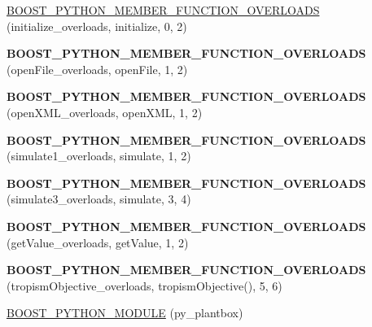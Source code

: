 \begin{DoxyCompactItemize}
\item 
\hyperlink{namespaceCPlantBox_a514e67aca132b8cd62c205379bb605f7}{B\+O\+O\+S\+T\+\_\+\+P\+Y\+T\+H\+O\+N\+\_\+\+M\+E\+M\+B\+E\+R\+\_\+\+F\+U\+N\+C\+T\+I\+O\+N\+\_\+\+O\+V\+E\+R\+L\+O\+A\+DS} (initialize\+\_\+overloads, initialize, 0, 2)
\item 
\mbox{\label{namespaceCPlantBox_a901dc181167d9c4e987fce36f985075e}} 
{\bfseries B\+O\+O\+S\+T\+\_\+\+P\+Y\+T\+H\+O\+N\+\_\+\+M\+E\+M\+B\+E\+R\+\_\+\+F\+U\+N\+C\+T\+I\+O\+N\+\_\+\+O\+V\+E\+R\+L\+O\+A\+DS} (open\+File\+\_\+overloads, open\+File, 1, 2)
\item 
\mbox{\label{namespaceCPlantBox_a3a7d95d7e298f62f04e63c2dcf7d962b}} 
{\bfseries B\+O\+O\+S\+T\+\_\+\+P\+Y\+T\+H\+O\+N\+\_\+\+M\+E\+M\+B\+E\+R\+\_\+\+F\+U\+N\+C\+T\+I\+O\+N\+\_\+\+O\+V\+E\+R\+L\+O\+A\+DS} (open\+X\+M\+L\+\_\+overloads, open\+X\+ML, 1, 2)
\item 
\mbox{\label{namespaceCPlantBox_ab42091e634426bf70cc433c75160a366}} 
{\bfseries B\+O\+O\+S\+T\+\_\+\+P\+Y\+T\+H\+O\+N\+\_\+\+M\+E\+M\+B\+E\+R\+\_\+\+F\+U\+N\+C\+T\+I\+O\+N\+\_\+\+O\+V\+E\+R\+L\+O\+A\+DS} (simulate1\+\_\+overloads, simulate, 1, 2)
\item 
\mbox{\label{namespaceCPlantBox_a84372c69d75e167505c1a62f152f032d}} 
{\bfseries B\+O\+O\+S\+T\+\_\+\+P\+Y\+T\+H\+O\+N\+\_\+\+M\+E\+M\+B\+E\+R\+\_\+\+F\+U\+N\+C\+T\+I\+O\+N\+\_\+\+O\+V\+E\+R\+L\+O\+A\+DS} (simulate3\+\_\+overloads, simulate, 3, 4)
\item 
\mbox{\label{namespaceCPlantBox_aff7bfa602bc18a62c4ae6ae8be8a221a}} 
{\bfseries B\+O\+O\+S\+T\+\_\+\+P\+Y\+T\+H\+O\+N\+\_\+\+M\+E\+M\+B\+E\+R\+\_\+\+F\+U\+N\+C\+T\+I\+O\+N\+\_\+\+O\+V\+E\+R\+L\+O\+A\+DS} (get\+Value\+\_\+overloads, get\+Value, 1, 2)
\item 
\mbox{\label{namespaceCPlantBox_a2590a33f0ec61d7d015a5db83b76f45d}} 
{\bfseries B\+O\+O\+S\+T\+\_\+\+P\+Y\+T\+H\+O\+N\+\_\+\+M\+E\+M\+B\+E\+R\+\_\+\+F\+U\+N\+C\+T\+I\+O\+N\+\_\+\+O\+V\+E\+R\+L\+O\+A\+DS} (tropism\+Objective\+\_\+overloads, tropism\+Objective(), 5, 6)
\item 
\hyperlink{namespaceCPlantBox_ac513e5a3c7d45d7293dc9d009901bd32}{B\+O\+O\+S\+T\+\_\+\+P\+Y\+T\+H\+O\+N\+\_\+\+M\+O\+D\+U\+LE} (py\+\_\+plantbox)
\end{DoxyCompactItemize}
